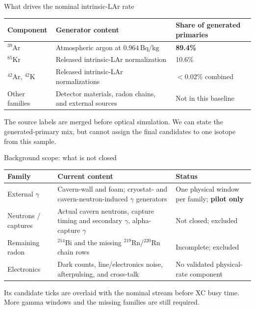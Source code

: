 \documentclass[aspectratio=169,11pt]{beamer}
\begin{document}
\begin{frame}{What drives the nominal intrinsic-LAr rate}
  \footnotesize
  \setlength{\tabcolsep}{4pt}
  \renewcommand{\arraystretch}{1.20}
  \begin{tabular}{@{}p{}p{}p{}@{}}
    \toprule
    Component & Generator content & Share of generated primaries \\
    \midrule
    \(^{39}\)Ar & Atmospheric argon at \(0.964\,\mathrm{Bq/kg}\) & \textbf{89.4\%} \\
    \(^{85}\)Kr & Released intrinsic-LAr normalization & 10.6\% \\
    \(^{42}\)Ar, \(^{42}\)K & Released intrinsic-LAr normalizations & $<0.02\%$ combined \\
    Other families & Detector materials, radon chains, and external sources & Not in this baseline \\
    \bottomrule
  \end{tabular}

  \medskip
    {The source labels are merged before optical simulation. We can state the generated-primary mix, but cannot assign the final candidates to one isotope from this sample.}
\end{frame}

\begin{frame}{Background scope: what is not closed}
  \footnotesize
  \setlength{\tabcolsep}{4pt}
  \renewcommand{\arraystretch}{1.16}
  \begin{tabular}{@{}p{}p{}p{}@{}}
    \toprule
    Family & Current content & Status \\
    \midrule
    External \(\gamma\) & Cavern-wall and foam; cryostat- and cavern-neutron-induced \(\gamma\) generators & One physical window per family; \textbf{pilot only} \\
    Neutrons / captures & Actual cavern neutrons, capture timing and secondary \(\gamma\), alpha-capture \(\gamma\) & Not closed; excluded \\
    Remaining radon & \(^{214}\)Bi and the missing \(^{219}\)Rn/\(^{220}\)Rn chain rows & Incomplete; excluded \\
    Electronics & Dark counts, line/electronics noise, afterpulsing, and cross-talk & No validated physical-rate component \\
    \bottomrule
  \end{tabular}

  \medskip
    {Its candidate ticks are overlaid with the nominal stream before XC busy time. More gamma windows and the missing families are still required.}
\end{frame}
\end{document}
